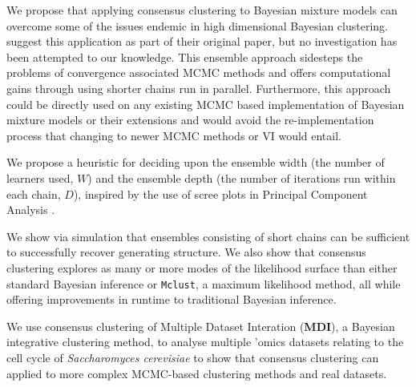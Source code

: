 \documentclass{bmcart}
\begin{document}
We propose that applying consensus clustering to Bayesian mixture models can overcome some of the issues endemic in high dimensional Bayesian clustering. \cite{monti2003consensus} suggest this application as part of their original paper, but no investigation has been attempted to our knowledge. This ensemble approach  sidesteps the problems of convergence associated MCMC methods and offers computational gains through using shorter chains run in parallel. Furthermore, this approach could be directly used on any existing MCMC based implementation of Bayesian mixture models or their extensions and would avoid the re-implementation process that changing to newer MCMC methods or VI would entail.

We propose a heuristic for deciding upon the ensemble width (the number of learners used, $W$) and the ensemble depth (the number of iterations run within each chain, $D$), inspired by the use of scree plots in Principal Component Analysis \citep[\textbf{PCA}][]{wold1987principal}.


We show via simulation that ensembles consisting of short chains can be sufficient to successfully recover generating structure. We also show that consensus clustering explores as many or more modes of the likelihood surface than either standard Bayesian inference or \texttt{Mclust}, a maximum likelihood method, all while offering improvements in runtime to traditional Bayesian inference.


We use consensus clustering of Multiple Dataset Interation (\textbf{MDI}), a Bayesian integrative clustering method, to analyse multiple ’omics datasets relating to the cell cycle of \emph{Saccharomyces cerevisiae} to show that consensus clustering can applied to more complex MCMC-based clustering methods and real datasets.
\end{document}
